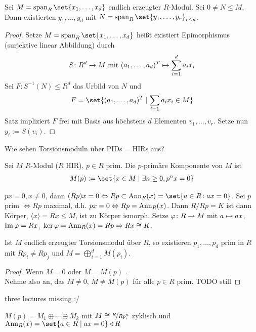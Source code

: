 \begin{conclusion}
	Sei $M = \Span_R\set{x_1, \dots, x_d}$ endlich erzeugter $R$-Modul. Sei $0 \neq N \le M$. Dann existierten $y_1, \dots, y_d$ mit $N = \Span_R\set{y_1, \dots, y_r}_{r \le d}$.
\end{conclusion}
\begin{proof}
	Setze $M = \Span_R\set{x_1, \dots, x_d}$ heißt existiert Epimorphismus (surjektive linear Abbildung) durch 
	\begin{align*}
		S\colon R^d \to M \mit (a_1, \dots, a_d)^T \mapsto \sum_{i=1}^d a_i x_i
	\end{align*}
	Sei $F\colon S^{-1}(N) \le R^d$ das Urbild von $N$ und
	\begin{align*}
		F = \set{(a_1, \dots, a_d)^T \mid \sum_{i=1}a_i x_i \in M}
	\end{align*}
	Satz impliziert $F$ frei mit Basis aus höchstens $d$ Elementen $v_1, \dots, v_r$. Setze nun $y_i := S(v_i)$.
\end{proof}
Wie sehen Torsionsmoduln über PIDs = HIRs aus?
\begin{definition}
	Sei $M$ $R$-Modul ($R$ HIR), $p \in R$ prim. Die $p$-primäre Komponente von $M$ ist
	\begin{align*}
		M(p) := \set{x \in M \mid \exists n \ge 0, p^n x = 0}
	\end{align*}
\end{definition}
\begin{remark}
	$px = 0, x \neq 0$, dann $(Rp)x = 0 \Leftrightarrow Rp \subset \Ann_R(x) = \set{a \in R \colon ax = 0}$. Sei $p$ prim $\Leftrightarrow Rp$ maximal, d.h. $px = 0 \Leftrightarrow Rp = \Ann_R(x)$. Dann $R/Rp = K$ ist dann Körper, $\langle x \rangle = Rx \le M$, ist zu Körper ismorph. Setze $\varphi\colon R \to M \mit a \mapsto ax$, $\Image \varphi = Rx$, $\ker \varphi = \Ann_R(x) = Rp \implies Rx \cong K$.
\end{remark}
\begin{proposition}
	Ist $M$ endlich erzeugter Torsionsmodul über $R$, so existieren $p_1, \dots, p_d$ prim in $R$ mit $Rp_i \neq Rp_j$ und $M = \bigoplus_{i=1}^d M(p_i)$.
\end{proposition}
\begin{proof}
	Wenn $M = 0$ oder $M = M(p)$ \checkmark.\\
	Nehme also an, das $M \neq 0$, $M \neq M(p)$ für alle $p \in R$ prim. TODO still
\end{proof}
three lectures missing :/
\begin{theorem}
	$M(p) = M_1 \oplus \cdots \oplus M_k$ mit $M \cong \lnkset{R}{Rp^n_i}$ zyklisch und $\Ann_R(x) = \set{a \in R \mid ax = 0} \lhd R$
\end{theorem}
